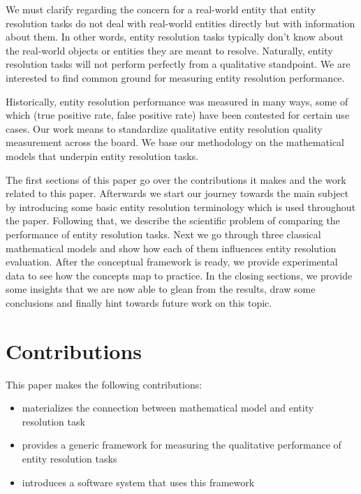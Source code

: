 \documentclass[11pt]{article}
\begin{document}
    We must clarify regarding the concern for a real-world entity that entity
    resolution tasks do not deal with real-world entities directly but with
    information about them\cite{Tal11}.
    In other words, entity resolution tasks typically don't know about the
    real-world objects or entities they are meant to resolve\cite{Chen09}.
    Naturally, entity resolution tasks will not perform perfectly from a
    qualitative standpoint.
    We are interested to find common ground for measuring entity resolution
    performance.
    
    Historically, entity resolution performance was measured in many ways, some
    of which (true positive rate, false positive rate) have been contested for
    certain use cases\cite{Goga2015}.
    Our work means to standardize qualitative entity resolution quality
    measurement across the board.
    We base our methodology on the mathematical models that underpin entity
    resolution tasks.

    The first sections of this paper go over the contributions it makes and the
    work related to this paper.
    Afterwards we start our journey towards the main subject by introducing some
    basic entity resolution terminology which is used throughout the paper.
    Following that, we describe the scientific problem of comparing the
    performance of entity resolution tasks.
    Next we go through three classical mathematical models and show how each of
    them influences entity resolution evaluation.
    After the conceptual framework is ready, we provide experimental data to see
    how the concepts map to practice.
    In the closing sections, we provide some insights that we are now able to 
    glean from the results, draw some conclusions and finally hint towards
    future work on this topic.

    \section{Contributions}\label{sec:contributions}

    This paper makes the following contributions:

    \begin{itemize}
        \item materializes the connection between mathematical model and entity
        resolution task
        \item provides a generic framework for measuring the qualitative
        performance of entity resolution tasks
        \item introduces a software system that uses this framework
    \end{itemize}
\end{document}
